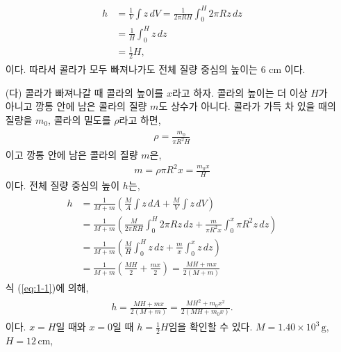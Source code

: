 \documentclass[floatfix,nofootinbib,superscriptaddress,fleqn]{revtex4-2}
\begin{document}
\begin{itemize}
  \begin{align}
    \begin{split}
      h&=\frac{1}{V}\int z\,dV 
      = \frac{1}{2\pi R H}\int_0^H 2\pi R z\,dz \\
      &=\frac{1}{H}\int_0^H z\,dz \\
      &=\frac{1}{2}H,
    \end{split}
  \end{align}
  이다. 따라서 콜라가 모두 빠져나가도 전체 질량 중심의 높이는 6 cm 이다.
  \item[(다)] 콜라가 빠져나갈 때 콜라의 높이를 $x$라고 하자. 콜라의 높이는 
  더 이상 $H$가 아니고 깡통 안에 남은 콜라의 질량 $m$도 상수가 아니다. 콜라가 
  가득 차 있을 때의 질량을 $m_0$,
  콜라의 밀도를 $\rho$라고 하면,
  \begin{align}
    \begin{split}
      \rho = \frac{m_0}{\pi R^2 H}
    \end{split}
  \end{align}
  이고 깡통 안에 남은 콜라의 질량 $m$은,
  \begin{align}\label{eq:1-1}
    m= \rho\pi R^2 x = \frac{m_0x}{H}
  \end{align}
  이다.
  전체 질량 중심의 높이 $h$는,
  \begin{align}
    \begin{split}
      h &= \frac{1}{M+m}\left(\frac{M}{A}\int z\,dA
      +\frac{M}{V}\int z\,dV\right) \\
      &= \frac{1}{M+m}\left(\frac{M}{2\pi R H}\int_0^H 2\pi R z\,dz
      +\frac{m}{\pi R^2 x}\int_0^x\pi R^2 z\,dz\right)  \\
      &= \frac{1}{M+m}\left(\frac{M}{H}\int_0^H z\,dz
      +\frac{m}{x}\int_0^x z\,dz\right) \\
      &= \frac{1}{M+m}\left(\frac{MH}{2}
      +\frac{mx}{2}\right) = \frac{MH+mx}{2(M+m)}
    \end{split}
  \end{align}
  식 (\ref{eq:1-1})에 의해,
  \begin{align}\label{eq:1-2}
    \begin{split}
      h = \frac{MH+mx}{2(M+m)}=\frac{MH^2+m_0x^2}{2(MH+m_0x)}.
    \end{split}
  \end{align}
  이다. $x=H$일 때와 $x=0$일 때 $h=\frac{1}{2}H$임을 확인할 수 있다.
  $M=1.40\times 10^{3}\,\mathrm{g}$, $H=12\,\mathrm{cm}$,

\end{itemize}
\end{document}
